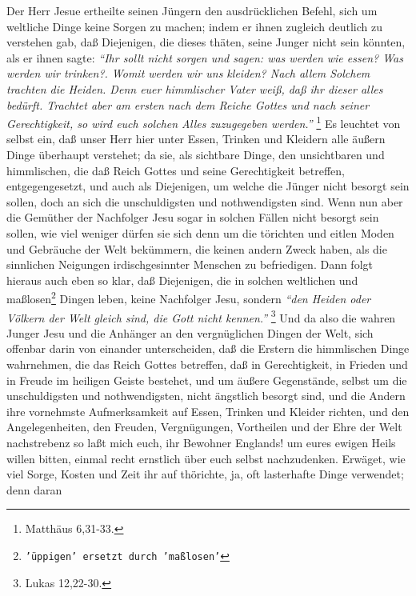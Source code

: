 Der Herr Jesue ertheilte seinen Jüngern den ausdrücklichen Befehl, sich um
weltliche Dinge keine Sorgen zu machen; indem er ihnen zugleich deutlich zu
verstehen gab, daß Diejenigen, die dieses thäten, seine Junger nicht sein
könnten, als er ihnen sagte:
\textit{"`Ihr sollt nicht sorgen und sagen: was werden wie
essen? Was werden wir trinken?. Womit werden wir uns kleiden? Nach allem Solchem
trachten die Heiden. Denn euer himmlischer Vater weiß, daß ihr dieser alles
bedürft. Trachtet aber am ersten nach dem Reiche Gottes und nach seiner
Gerechtigkeit, so wird euch solchen Alles zuzugegeben werden."'}
\footnote{Matthäus 6,31-33.}
Es leuchtet von selbst ein, daß unser Herr hier unter Essen,
Trinken und Kleidern alle äußern Dinge überhaupt verstehet; da sie, als
sichtbare Dinge, den unsichtbaren und himmlischen, die daß Reich Gottes und
seine Gerechtigkeit betreffen, entgegengesetzt, und auch als Diejenigen, um
welche die Jünger nicht besorgt sein sollen, doch an sich die unschuldigsten und
nothwendigsten sind. Wenn nun aber die Gemüther der Nachfolger Jesu sogar in
solchen Fällen nicht besorgt sein sollen, wie viel weniger dürfen sie sich denn
um die törichten und eitlen Moden und Gebräuche der Welt bekümmern, die keinen
andern Zweck haben, als die sinnlichen Neigungen irdischgesinnter Menschen zu
befriedigen. Dann folgt hieraus auch eben so klar, daß Diejenigen, die in
solchen weltlichen und maßlosen\footnote{\texttt{'üppigen' ersetzt durch 'maßlosen'}}
Dingen leben, keine Nachfolger Jesu, sondern
\textit{"`den Heiden oder Völkern der Welt gleich sind, die Gott nicht
kennen."'}
\footnote{Lukas 12,22-30.}
Und da also die wahren Junger Jesu und die
Anhänger an den vergnüglichen Dingen der Welt, sich offenbar darin von einander
unterscheiden, daß die Erstern die himmlischen Dinge wahrnehmen, die das Reich
Gottes betreffen, daß in Gerechtigkeit, in Frieden und in Freude im heiligen
Geiste bestehet, und um äußere Gegenstände, selbst um die unschuldigsten und
nothwendigsten, nicht ängstlich besorgt sind, und die Andern ihre vornehmste
Aufmerksamkeit auf Essen, Trinken und Kleider richten, und den Angelegenheiten,
den Freuden, Vergnügungen, Vortheilen und der Ehre der Welt nachstrebenz so laßt
mich euch, ihr Bewohner Englands! um eures ewigen Heils willen bitten, einmal
recht ernstlich über euch selbst nachzudenken. Erwäget, wie viel Sorge, Kosten
und Zeit ihr auf thörichte, ja, oft lasterhafte Dinge verwendet; denn daran

